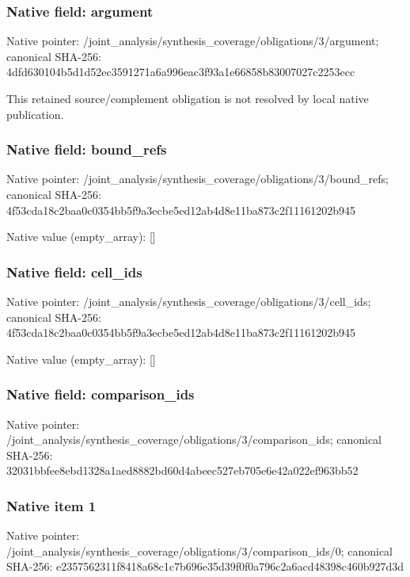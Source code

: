 \documentclass[10pt,a4paper]{article}
\begin{document}
\subsubsection{Native field: argument}
Native pointer: /joint\_\allowbreak{}analysis/synthesis\_\allowbreak{}coverage/obligations/3/argument; canonical SHA-256: 4dfd630104b5d1d52ec3591271a6a996eac3f93a1e66858b83007027c2253ecc

\begingroup\raggedright\sloppy This retained source/\allowbreak{}complement obligation is not resolved by local native publication.\par\endgroup

\subsubsection{Native field: bound\_\allowbreak{}refs}
Native pointer: /joint\_\allowbreak{}analysis/synthesis\_\allowbreak{}coverage/obligations/3/bound\_\allowbreak{}refs; canonical SHA-256: 4f53cda18c2baa0c0354bb5f9a3ecbe5ed12ab4d8e11ba873c2f11161202b945

Native value (empty\_\allowbreak{}array): []

\subsubsection{Native field: cell\_\allowbreak{}ids}
Native pointer: /joint\_\allowbreak{}analysis/synthesis\_\allowbreak{}coverage/obligations/3/cell\_\allowbreak{}ids; canonical SHA-256: 4f53cda18c2baa0c0354bb5f9a3ecbe5ed12ab4d8e11ba873c2f11161202b945

Native value (empty\_\allowbreak{}array): []

\subsubsection{Native field: comparison\_\allowbreak{}ids}
Native pointer: /joint\_\allowbreak{}analysis/synthesis\_\allowbreak{}coverage/obligations/3/comparison\_\allowbreak{}ids; canonical SHA-256: 32031bbfee8ebd1328a1aed8882bd60d4abeec527eb705e6e42a022ef963bb52

\subsubsection{Native item 1}
Native pointer: /joint\_\allowbreak{}analysis/synthesis\_\allowbreak{}coverage/obligations/3/comparison\_\allowbreak{}ids/0; canonical SHA-256: e2357562311f8418a68c1c7b696e35d39f0f0a796c2a6acd48398c460b927d3d
\end{document}
